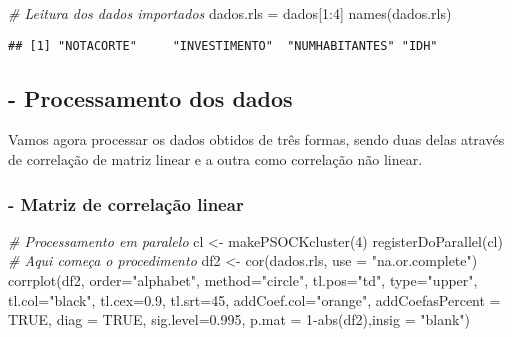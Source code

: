 \documentclass[
]{article}
\newenvironment{Shaded}{\begin{snugshade}}{\end{snugshade}}
\newcommand{\AttributeTok}[1]{\textcolor[rgb]{0.77,0.63,0.00}{#1}}
\newcommand{\CommentTok}[1]{\textcolor[rgb]{0.56,0.35,0.01}{\textit{#1}}}
\newcommand{\ConstantTok}[1]{\textcolor[rgb]{0.00,0.00,0.00}{#1}}
\newcommand{\DecValTok}[1]{\textcolor[rgb]{0.00,0.00,0.81}{#1}}
\newcommand{\FloatTok}[1]{\textcolor[rgb]{0.00,0.00,0.81}{#1}}
\newcommand{\FunctionTok}[1]{\textcolor[rgb]{0.00,0.00,0.00}{#1}}
\newcommand{\NormalTok}[1]{#1}
\newcommand{\OtherTok}[1]{\textcolor[rgb]{0.56,0.35,0.01}{#1}}
\newcommand{\SpecialCharTok}[1]{\textcolor[rgb]{0.00,0.00,0.00}{#1}}
\newcommand{\StringTok}[1]{\textcolor[rgb]{0.31,0.60,0.02}{#1}}
\begin{document}
\begin{Shaded}
\begin{Highlighting}[]
\CommentTok{\# Leitura dos dados importados}
\NormalTok{dados.rls }\OtherTok{=}\NormalTok{ dados[}\DecValTok{1}\SpecialCharTok{:}\DecValTok{4}\NormalTok{]}
\FunctionTok{names}\NormalTok{(dados.rls)}
\end{Highlighting}
\end{Shaded}

\begin{verbatim}
## [1] "NOTACORTE"     "INVESTIMENTO"  "NUMHABITANTES" "IDH"
\end{verbatim}

\hypertarget{processamento-dos-dados}{%
\subsection{- Processamento dos dados}\label{processamento-dos-dados}}

Vamos agora processar os dados obtidos de três formas, sendo duas delas
através de correlação de matriz linear e a outra como correlação não
linear.

\hypertarget{matriz-de-correlauxe7uxe3o-linear}{%
\subsubsection{- Matriz de correlação
linear}\label{matriz-de-correlauxe7uxe3o-linear}}

\begin{Shaded}
\begin{Highlighting}[]
\CommentTok{\# Processamento em paralelo}
\NormalTok{cl }\OtherTok{\textless{}{-}} \FunctionTok{makePSOCKcluster}\NormalTok{(}\DecValTok{4}\NormalTok{)}
\FunctionTok{registerDoParallel}\NormalTok{(cl)}
\CommentTok{\# Aqui começa o procedimento}
\NormalTok{df2 }\OtherTok{\textless{}{-}} \FunctionTok{cor}\NormalTok{(dados.rls, }\AttributeTok{use =} \StringTok{"na.or.complete"}\NormalTok{)}
\FunctionTok{corrplot}\NormalTok{(df2, }\AttributeTok{order=}\StringTok{"alphabet"}\NormalTok{, }\AttributeTok{method=}\StringTok{"circle"}\NormalTok{, }\AttributeTok{tl.pos=}\StringTok{"td"}\NormalTok{, }\AttributeTok{type=}\StringTok{"upper"}\NormalTok{, }
         \AttributeTok{tl.col=}\StringTok{"black"}\NormalTok{, }\AttributeTok{tl.cex=}\FloatTok{0.9}\NormalTok{, }\AttributeTok{tl.srt=}\DecValTok{45}\NormalTok{, }
         \AttributeTok{addCoef.col=}\StringTok{"orange"}\NormalTok{, }\AttributeTok{addCoefasPercent =} \ConstantTok{TRUE}\NormalTok{, }\AttributeTok{diag =} \ConstantTok{TRUE}\NormalTok{,}
         \AttributeTok{sig.level=}\FloatTok{0.995}\NormalTok{, }\AttributeTok{p.mat =} \DecValTok{1}\SpecialCharTok{{-}}\FunctionTok{abs}\NormalTok{(df2),}\AttributeTok{insig =} \StringTok{"blank"}\NormalTok{)}
\end{Highlighting}
\end{Shaded}
\end{document}
